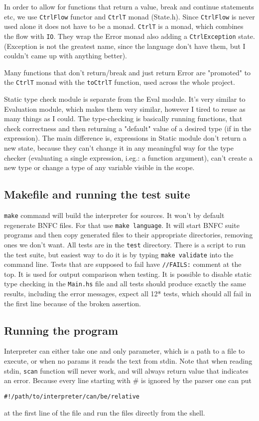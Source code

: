 \documentclass[11pt]{article}
\begin{document}
In order to allow for functions that return a value, break and continue
statements etc, we use \texttt{CtrlFlow} functor and \texttt{CtrlT} monad
(State.h). Since \texttt{CtrlFlow} is never used alone it does not have to be
a monad. \texttt{CtrlT} is a monad, which combines the flow with \texttt{IO}.
They wrap the Error monad also adding a \texttt{CtrlException} state.
(Exception is not the greatest name, since the language don't have them, but
I couldn't came up with anything better).

Many functions that don't return/break and just return Error are "promoted"
to the \texttt{CtrlT} monad with the \texttt{toCtrlT} function, used across
the whole project.

Static type check module is separate from the Eval module. It's very similar
to Evaluation module, which makes them very similar, however I tired to reuse
as many things as I could. The type-checking is basically running functions,
that check correctness and then returning a "default" value of a desired type
(if in the expression). The main difference is, expressions in Static module
don't return a new state, because they can't change it in any meaningful way
for the type checker (evaluating a single expression, i.eg.: a function
argument), can't create a new type or change a type of any variable visible
in the scope.
\subsection*{Makefile and running the test suite}
\label{sec:org013bb03}
\texttt{make} command will build the interpreter for sources. It won't by
default regenerate BNFC files. For that use \texttt{make language}. It will
start BNFC suite programs and then copy generated files to their appropriate
directories, removing ones we don't want. All tests are in the \texttt{test}
directory. There is a script to run the test suite, but easiest way to do it
is by typing \texttt{make validate} into the command line. Tests that are
supposed to fail have \texttt{//FAILS:} comment at the top. It is used for
output comparison when testing. It is possible to disable static type
checking in the \texttt{Main.hs} file and all tests should produce exactly
the same results, including the error messages, expect all 12* tests, which
should all fail in the first line because of the broken assertion.

\subsection*{Running the program}
\label{sec:org3264c6b}
Interpreter can either take one and only parameter, which is a path to a
file to execute, or when no params it reads the text from stdin. Note that
when reading stdin, \texttt{scan} function will never work, and will always
return value that indicates an error. Because every line starting with \# is
ignored by the parser one can put
\begin{verbatim}
#!/path/to/interpreter/can/be/relative
\end{verbatim}
at the first line of the file and run the files directly from the shell.
\end{document}
